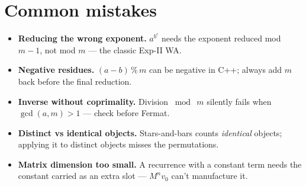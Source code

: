 \section{Common mistakes}
\begin{itemize}
\item \textbf{Reducing the wrong exponent.} $a^{b^c}$ needs the
exponent reduced mod $m{-}1$, not mod $m$ --- the classic Exp-II
WA.
\item \textbf{Negative residues.} $(a-b)\,\%\,m$ can be negative in
C++; always add $m$ back before the final reduction.
\item \textbf{Inverse without coprimality.} Division $\bmod\ m$
silently fails when $\gcd(a,m)>1$ --- check before Fermat.
\item \textbf{Distinct vs identical objects.} Stars-and-bars counts
\emph{identical} objects; applying it to distinct objects misses the
permutations.
\item \textbf{Matrix dimension too small.} A recurrence with a
constant term needs the constant carried as an extra slot ---
$M^n v_0$ can't manufacture it.
\end{itemize}

